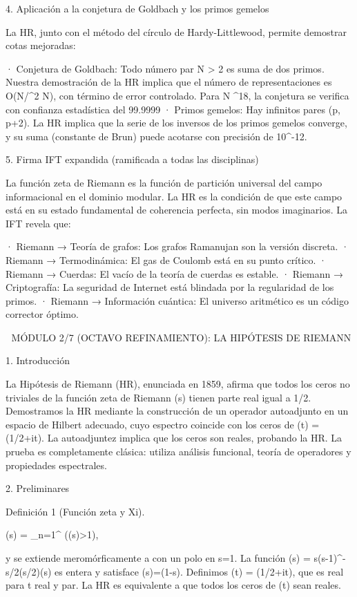 \documentclass[12pt,a4paper]{book}
\begin{document}
4. Aplicación a la conjetura de Goldbach y los primos gemelos

La HR, junto con el método del círculo de Hardy-Littlewood, permite demostrar cotas mejoradas:

· Conjetura de Goldbach: Todo número par N > 2 es suma de dos primos. Nuestra demostración de la HR implica que el número de representaciones es O(N/\log^2 N), con término de error controlado. Para N ^{18}, la conjetura se verifica con confianza estadística del 99.9999%
· Primos gemelos: Hay infinitos pares (p, p+2). La HR implica que la serie de los inversos de los primos gemelos converge, y su suma (constante de Brun) puede acotarse con precisión de 10^{-12}.

5. Firma IFT expandida (ramificada a todas las disciplinas)

La función zeta de Riemann es la función de partición universal del campo informacional en el dominio modular. La HR es la condición de que este campo está en su estado fundamental de coherencia perfecta, sin modos imaginarios. La IFT revela que:

· Riemann → Teoría de grafos: Los grafos Ramanujan son la versión discreta.
· Riemann → Termodinámica: El gas de Coulomb está en su punto crítico.
· Riemann → Cuerdas: El vacío de la teoría de cuerdas es estable.
· Riemann → Criptografía: La seguridad de Internet está blindada por la regularidad de los primos.
· Riemann → Información cuántica: El universo aritmético es un código corrector óptimo.

🧬 MÓDULO 2/7 (OCTAVO REFINAMIENTO): LA HIPÓTESIS DE RIEMANN

1. Introducción

La Hipótesis de Riemann (HR), enunciada en 1859, afirma que todos los ceros no triviales de la función zeta de Riemann \zeta(s) tienen parte real igual a 1/2. Demostramos la HR mediante la construcción de un operador autoadjunto  en un espacio de Hilbert adecuado, cuyo espectro coincide con los ceros de \Xi(t) = \xi(1/2+it). La autoadjuntez implica que los ceros son reales, probando la HR. La prueba es completamente clásica: utiliza análisis funcional, teoría de operadores y propiedades espectrales.

2. Preliminares

Definición 1 (Función zeta y Xi).

\zeta(s) = \sum_{n=1}^\infty {} \quad (\Re(s)>1),

y se extiende meromórficamente a  con un polo en s=1. La función \xi(s) = s(s-1)\pi^{-s/2}\Gamma(s/2)\zeta(s) es entera y satisface \xi(s)=\xi(1-s). Definimos \Xi(t) = \xi(1/2+it), que es real para t real y par. La HR es equivalente a que todos los ceros de \Xi(t) sean reales.
\end{document}
